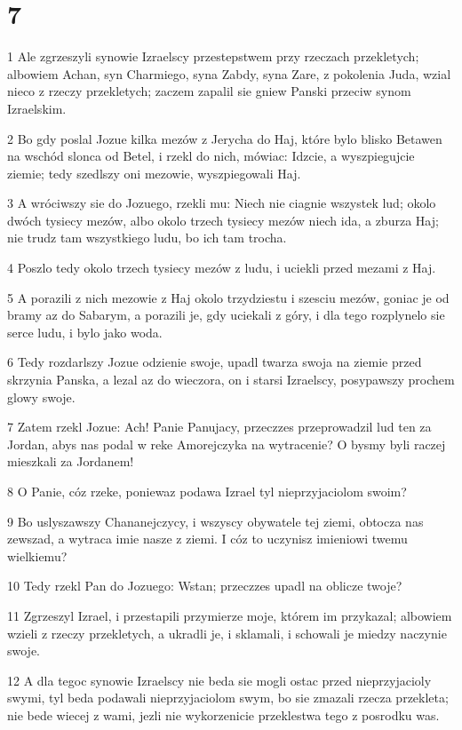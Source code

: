\chapter{7}

\par 1 Ale zgrzeszyli synowie Izraelscy przestepstwem przy rzeczach przekletych; albowiem Achan, syn Charmiego, syna Zabdy, syna Zare, z pokolenia Juda, wzial nieco z rzeczy przekletych; zaczem zapalil sie gniew Panski przeciw synom Izraelskim.
\par 2 Bo gdy poslal Jozue kilka mezów z Jerycha do Haj, które bylo blisko Betawen na wschód slonca od Betel, i rzekl do nich, mówiac: Idzcie, a wyszpiegujcie ziemie; tedy szedlszy oni mezowie, wyszpiegowali Haj.
\par 3 A wróciwszy sie do Jozuego, rzekli mu: Niech nie ciagnie wszystek lud; okolo dwóch tysiecy mezów, albo okolo trzech tysiecy mezów niech ida, a zburza Haj; nie trudz tam wszystkiego ludu, bo ich tam trocha.
\par 4 Poszlo tedy okolo trzech tysiecy mezów z ludu, i uciekli przed mezami z Haj.
\par 5 A porazili z nich mezowie z Haj okolo trzydziestu i szesciu mezów, goniac je od bramy az do Sabarym, a porazili je, gdy uciekali z góry, i dla tego rozplynelo sie serce ludu, i bylo jako woda.
\par 6 Tedy rozdarlszy Jozue odzienie swoje, upadl twarza swoja na ziemie przed skrzynia Panska, a lezal az do wieczora, on i starsi Izraelscy, posypawszy prochem glowy swoje.
\par 7 Zatem rzekl Jozue: Ach! Panie Panujacy, przeczzes przeprowadzil lud ten za Jordan, abys nas podal w reke Amorejczyka na wytracenie? O bysmy byli raczej mieszkali za Jordanem!
\par 8 O Panie, cóz rzeke, poniewaz podawa Izrael tyl nieprzyjaciolom swoim?
\par 9 Bo uslyszawszy Chananejczycy, i wszyscy obywatele tej ziemi, obtocza nas zewszad, a wytraca imie nasze z ziemi. I cóz to uczynisz imieniowi twemu wielkiemu?
\par 10 Tedy rzekl Pan do Jozuego: Wstan; przeczzes upadl na oblicze twoje?
\par 11 Zgrzeszyl Izrael, i przestapili przymierze moje, którem im przykazal; albowiem wzieli z rzeczy przekletych, a ukradli je, i sklamali, i schowali je miedzy naczynie swoje.
\par 12 A dla tegoc synowie Izraelscy nie beda sie mogli ostac przed nieprzyjacioly swymi, tyl beda podawali nieprzyjaciolom swym, bo sie zmazali rzecza przekleta; nie bede wiecej z wami, jezli nie wykorzenicie przeklestwa tego z posrodku was.
